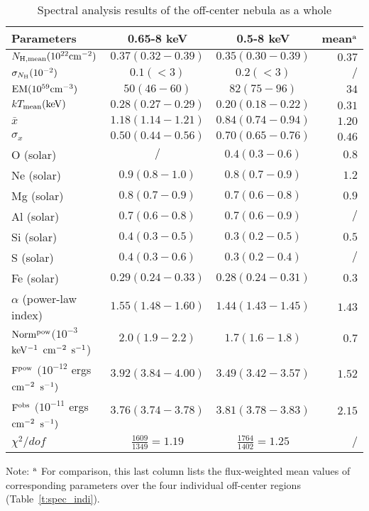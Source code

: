 \documentclass[usenatbib]{mnras}
\begin{document}
\begin{table}
\caption{Spectral analysis results of the off-center nebula as a whole }
\label{t:off-center}
\def\arraystretch{1.2}
\begin{tabular}{lccr}
\hline
Parameters & 0.65-8 keV & 0.5-8 keV & mean${}^{\rm a}$ \\
\hline
$N_{\rm H, mean} (10^{22}\rm{cm}^{-2})$ & $0.37(0.32-0.39)$ & $0.35(0.30-0.39)$ & $0.37$ \\
$\sigma_{N_{\rm H}} (10^{-2})$ & $0.1(<3)$ & $0.2(<3)$ & $/$\\

$\rm{EM(10^{59}cm^{-3})}$ & $50(46-60)$ & $82(75-96)$ & $34$\\
$kT_{\rm mean}(\rm{keV})$ & $0.28(0.27-0.29)$ & $0.20(0.18-0.22)$ & $0.31$\\
$\bar{x}\ $ &$1.18(1.14-1.21)$ & $0.84(0.74-0.94)$ &$1.20$\\
$\sigma_x\ $ & $0.50(0.44-0.56)$ & $0.70(0.65-0.76)$ & $0.46$\\
O (solar)& $/$ & $0.4(0.3-0.6)$ & $0.8$\\
Ne (solar)& $0.9(0.8-1.0)$ & $0.8(0.7-0.9)$ & $1.2$\\
Mg (solar)& $0.8(0.7-0.9)$ & $0.7(0.6-0.8)$ & $0.9$\\ 
Al (solar)& $0.7(0.6-0.8)$ & $0.7(0.6-0.9)$ & $/$\\
Si (solar)& $0.4(0.3-0.5)$ & $0.3(0.2-0.5)$ & $0.5$\\
S (solar)& $0.4(0.3-0.6)$ & $0.3(0.2-0.4)$ & $/$\\
Fe (solar)& $0.29(0.24-0.33)$ & $0.28(0.24-0.31)$ & $0.3$\\
$\alpha$ (power-law index)& $1.55(1.48-1.60)$ & $1.44(1.43-1.45)$ & $1.43$\\
\multirow{2}{1.5cm}{$\rm{Norm^{pow}}$$(10^{-3}$$\rm{keV^{-1}}$ $\rm{cm^{-2}}$ $\rm{s^{-1}}$)} & $2.0(1.9-2.2)$ & $1.7(1.6-1.8)$ & $0.7$\\
 &  &  &  \\
 \multirow{2}{2cm}{$\rm{F^{pow}}$ $(10^{-12}$ ergs $\rm{cm^{-2}}$ $\rm{s^{-1})}$} & $3.92(3.84-4.00)$ & $3.49(3.42-3.57)$ & $1.52$\\
 &  &  &  \\
\multirow{2}{2cm}{$\rm{F^{obs}}$ $(10^{-11}$ ergs $\rm{cm^{-2}}$ $\rm{s^{-1})}$} & $3.76(3.74-3.78)$ & $3.81(3.78-3.83)$ & $2.15$\\
 &  &  &  \\
$\chi^2/dof$ & $\frac{1609}{1349}=1.19$ & $\frac{1764}{1402}=1.25$ &$/$\\
\hline
\end{tabular}

Note:  ${}^{\rm a}$ For comparison, this last column lists the flux-weighted mean values of corresponding parameters over the four individual off-center regions (Table~\ref{t:spec_indi}).
\end{table}
\end{document}
